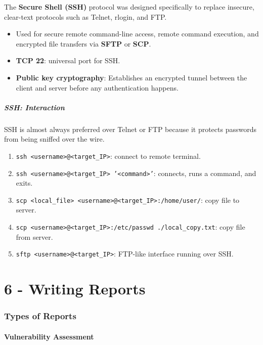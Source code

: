 \documentclass[12pt, letterpaper]{article}
\begin{document}
The \textbf{Secure Shell (SSH)} protocol was designed specifically to replace insecure, clear-text protocols such as Telnet, rlogin, and FTP.

\begin{itemize}
    \item Used for secure remote command-line access, remote command execution, and encrypted file transfers via \textbf{SFTP} or \textbf{SCP}.
    \item \textbf{TCP 22}: universal port for SSH.
    \item \textbf{Public key cryptography}: Establishes an encrypted tunnel between the client and server before any authentication happens.
\end{itemize}

\subsubsection*{SSH: Interaction}

SSH is almost always preferred over Telnet or FTP because it protects passwords from being sniffed over the wire.

\begin{enumerate}
    \item \texttt{ssh <username>@<target\_IP>}: connect to remote terminal.
    \item \texttt{ssh <username>@<target\_IP> '<command>'}: connects, runs a command, and exits.
    \item \texttt{scp <local\_file> <username>@<target\_IP>:/home/user/}: copy file to server.
    \item \texttt{scp <username>@<target\_IP>:/etc/passwd ./local\_copy.txt}: copy file from server.
    \item \texttt{sftp <username>@<target\_IP>}: FTP-like interface running over SSH.
\end{enumerate}

\part*{6 - Writing Reports}

\section*{Types of Reports}

\subsection*{Vulnerability Assessment}
\end{document}
